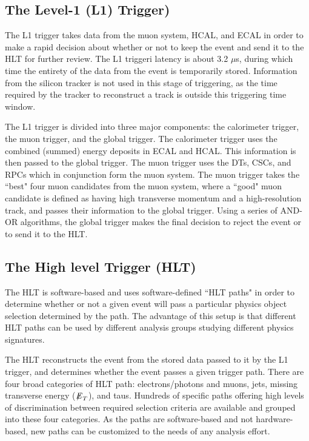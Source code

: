 \subsection{The Level-1 (L1) Trigger)}

The L1 trigger takes data from the muon system, HCAL, and ECAL in order to make a rapid decision about whether or not to keep the event and send it to the HLT for further review. The L1 triggeri latency is about 3.2 $\mu$s, during which time the entirety of the data from the event is temporarily stored. Information from the silicon tracker is not used in this stage of triggering, as the time required by the tracker to reconstruct a track is outside this triggering time window. 

The L1 trigger is divided into three major components: the calorimeter trigger, the muon trigger, and the global trigger. The calorimeter trigger uses the combined (summed) energy deposits in ECAL and HCAL. This information is then passed to the global trigger. The muon trigger uses the DTs, CSCs, and RPCs which in conjunction form the muon system. The muon trigger takes the ``best" four muon candidates from the muon system, where a ``good" muon candidate is defined as having high transverse momentum and a high-resolution track, and passes their information to the global trigger. Using a series of AND-OR algorithms, the global trigger makes the final decision to reject the event or to send it to the HLT.

\subsection{The High level Trigger (HLT)}

The HLT is software-based and uses software-defined ``HLT paths" in order to determine whether or not a given event will pass a particular physics object selection determined by the path. The advantage of this setup is that different HLT paths can be used by different analysis groups studying different physics signatures.

The HLT reconstructs the event from the stored data passed to it by the L1 trigger, and determines whether the event passes a given trigger path. There are four broad categories of HLT path: electrons/photons and muons, jets, missing transverse energy (${\not\mathrel{E}}_T$), and taus. Hundreds of specific paths offering high levels of discrimination between required selection criteria are available and grouped into these four categories. As the paths are software-based and not hardware-based, new paths can be customized to the needs of any analysis effort.


